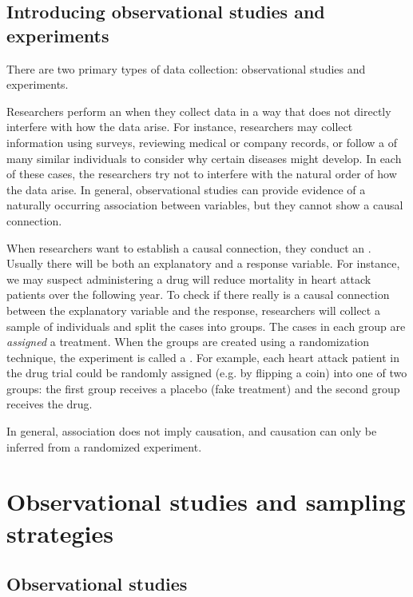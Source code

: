 \subsection{Introducing observational studies and experiments}

There are two primary types of data collection: observational studies and experiments.

Researchers perform an  when they collect data in a way that does not directly interfere with how the data arise. For instance, researchers may collect information using surveys, reviewing medical or company records, or follow a  of many similar individuals to consider why certain diseases might develop. In each of these cases, the researchers try not to interfere with the natural order of how the data arise. In general, observational studies can provide evidence of a naturally occurring association between variables, but they cannot show a causal connection.

When researchers want to establish a causal connection, they conduct an . Usually there will be both an explanatory and a response variable. For instance, we may suspect administering a drug will reduce mortality in heart attack patients over the following year. To check if there really is a causal connection between the explanatory variable and the response, researchers will collect a sample of individuals and split the cases into groups. The cases in each group are \emph{assigned} a treatment. When the groups are created using a randomization technique, the experiment is called a . For example, each heart attack patient in the drug trial could be randomly assigned (e.g. by flipping a coin) into one of two groups: the first group receives a placebo (fake treatment) and the second group receives the drug.

\begin{tipBox}{
In general, association does not imply causation, and causation can only be inferred from a randomized experiment.}
\end{tipBox}


\section{Observational studies and sampling strategies}

\subsection{Observational studies}

